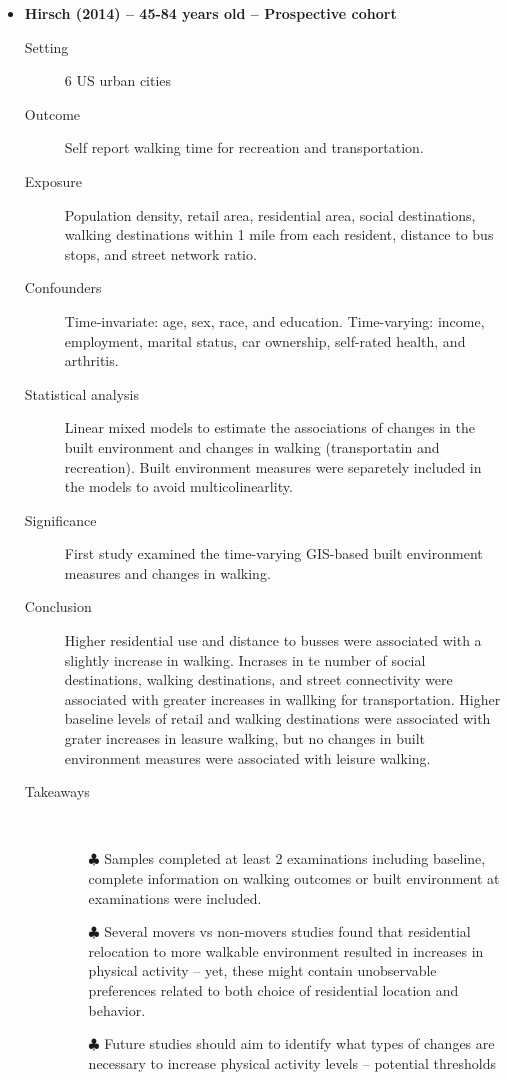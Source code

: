 \documentclass{article}
\begin{document}
\begin{itemize}
	\vspace{5mm}
	\item{\bf Hirsch (2014) -- 45-84 years old -- Prospective cohort} 
		\begin{description}
			\item[Setting] 6 US urban cities
			\item[Outcome] Self report walking time for recreation and transportation.
			\item[Exposure] Population density, retail area, residential area, social destinations, walking destinations within 1 mile from each resident, distance to bus stops, and street network ratio.
			\item[Confounders] Time-invariate: age, sex, race, and education. Time-varying: income, employment, marital status, car ownership, self-rated health, and arthritis. 
			\item[Statistical analysis] Linear mixed models to estimate the associations of changes in the built environment and changes in walking (transportatin and recreation). Built environment measures were separetely included in the models to avoid multicolinearlity.
			\item[Significance] First study examined the time-varying GIS-based built environment measures and changes in walking.
			\item[Conclusion] Higher residential use and distance to busses were associated with a slightly increase in walking. Incrases in te number of social destinations, walking destinations, and street connectivity were associated with greater increases in wallking for transportation. Higher baseline levels of retail and walking destinations were associated with grater increases in leasure walking, but no changes in built environment measures were associated with leisure walking.
			\item[Takeaways] \mbox{}\\
				\begin{itemize}
					\item[$\clubsuit$] Samples completed at least 2 examinations including baseline, complete information on walking outcomes or built environment at examinations were included.
					\item[$\clubsuit$] Several movers vs non-movers studies found that residential relocation to more walkable environment resulted in increases in physical activity -- yet, these might contain unobservable preferences related to both choice of residential location and behavior.
					\item[$\clubsuit$] Future studies should aim to identify what types of changes are necessary to increase physical activity levels -- potential thresholds
				\end{itemize}
			

\end{description}
\end{itemize}
\end{document}

